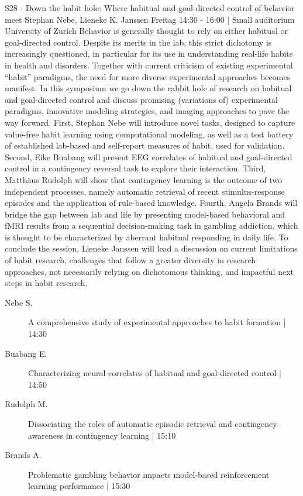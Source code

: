 
            \begin{symposium}
            {S28 - Down the habit hole: Where habitual and goal-directed control of behavior meet}
            {Stephan Nebe, Lieneke K. Janssen}
            {Freitag 14:30 - 16:00 | Small auditorium}
            { University of Zurich}
            Behavior is generally thought to rely on either habitual or goal-directed control. Despite its merits in the lab, this strict dichotomy is increasingly questioned, in particular for its use in understanding real-life habits in health and disorders. Together with current criticism of existing experimental “habit” paradigms, the need for more diverse experimental approaches becomes manifest. In this symposium we go down the rabbit hole of research on habitual and goal-directed control and discuss promising (variations of) experimental paradigms, innovative modeling strategies, and imaging approaches to pave the way forward. First, Stephan Nebe will introduce novel tasks, designed to capture value-free habit learning using computational modeling, as well as a test battery of established lab-based and self-report measures of habit, used for validation. Second, Eike Buabang will present EEG correlates of habitual and goal-directed control in a contingency reversal task to explore their interaction. Third, Matthäus Rudolph will show that contingency learning is the outcome of two independent processes, namely automatic retrieval of recent stimulus-response episodes and the application of rule-based knowledge. Fourth, Angela Brands will bridge the gap between lab and life by presenting model-based behavioral and fMRI results from a sequential decision-making task in gambling addiction, which is thought to be characterized by aberrant habitual responding in daily life. To conclude the session, Lieneke Janssen will lead a discussion on current limitations of habit research, challenges that follow a greater diversity in research approaches, not necessarily relying on dichotomous thinking, and impactful next steps in habit research.
            \begin{description}    
            
                \item [ Nebe S.] A comprehensive study of experimental approaches to habit formation \textcolor{mygray}{ | 14:30}    
                
                \item [ Buabang E.] Characterizing neural correlates of habitual and goal-directed control \textcolor{mygray}{ | 14:50}    
                
                \item [ Rudolph M.] Dissociating the roles of automatic episodic retrieval and contingency awareness in contingency learning \textcolor{mygray}{ | 15:10}    
                
                \item [ Brands A.] Problematic gambling behavior impacts model-based reinforcement learning performance \textcolor{mygray}{ | 15:30}    
                
            \end{description} 
            \end{symposium}
            